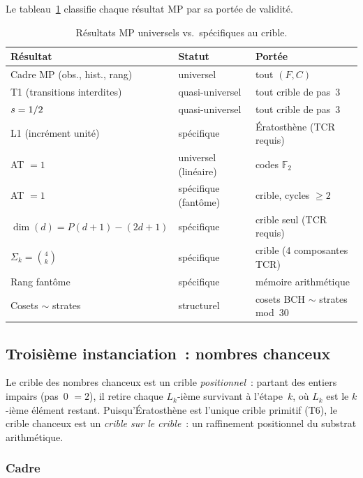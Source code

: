 \documentclass[12pt,a4paper]{article}
\begin{document}
Le tableau~\ref{tab:PM_classification} classifie chaque résultat MP
par sa portée de validité.

\begin{table}[htbp]
\centering
\caption{Résultats MP universels vs.\ spécifiques au crible.}
\label{tab:PM_classification}
\begin{tabular}{lll}
\toprule
\textbf{Résultat} & \textbf{Statut} & \textbf{Portée} \\
\midrule
Cadre MP (obs., hist., rang) & universel & tout $(F, C)$ \\
T1 (transitions interdites) & quasi-universel & tout crible de pas~3 \\
$s = 1/2$ & quasi-universel & tout crible de pas~3 \\
L1 (incrément unité) & spécifique & Ératosthène (TCR requis) \\
AT $= 1$ & universel (linéaire) & codes $\mathbb{F}_2$ \\
AT $= 1$ & spécifique (fantôme) & crible, cycles $\ge 2$ \\
$\dim(d) = P(d{+}1) - (2d{+}1)$ & spécifique & crible seul (TCR requis) \\
$\Sigma_k = \binom{4}{k}$ & spécifique & crible (4 composantes TCR) \\
Rang fantôme & spécifique & mémoire arithmétique \\
Cosets $\sim$ strates & structurel & cosets BCH $\sim$ strates mod~30 \\
\bottomrule
\end{tabular}
\end{table}


\subsection{Troisième instanciation~: nombres chanceux}
\label{sec:PM_lucky}

Le crible des nombres chanceux est un crible \emph{positionnel}~:
partant des entiers impairs (pas~0 $= 2$), il retire chaque
$L_k$-ième survivant à l'étape~$k$, où $L_k$ est le $k$-ième élément
restant. Puisqu'Ératosthène est l'unique crible primitif (T6), le
crible chanceux est un \emph{crible sur le crible}~: un raffinement
positionnel du substrat arithmétique.

\subsubsection{Cadre}
\end{document}
